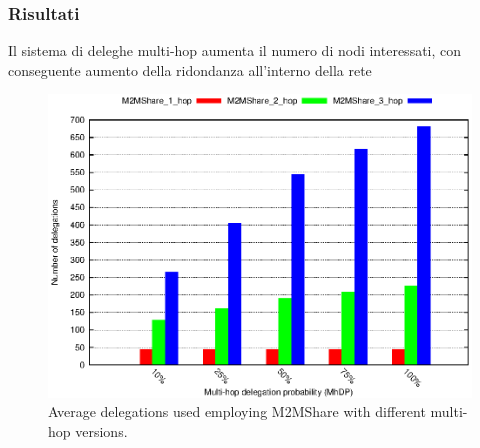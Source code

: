 \documentclass{beamer}
\begin{document}
\begin{frame}
\begin{figure}[htbp]
\vspace{-10pt}%
\pause
{}
\end{figure}
\end{frame}


\begin{frame}
\frametitle{Risultati}
Il sistema di deleghe multi-hop aumenta il numero di nodi interessati, con conseguente aumento della ridondanza all'interno della rete
\begin{center}
\begin{figure}[ht]
\includegraphics[scale=0.55]{delegheMultiHopPerc.eps}
\caption{Average delegations used employing M2MShare with different multi-hop versions.}
\end{figure}
\end{center}
\end{frame}
\end{document}
